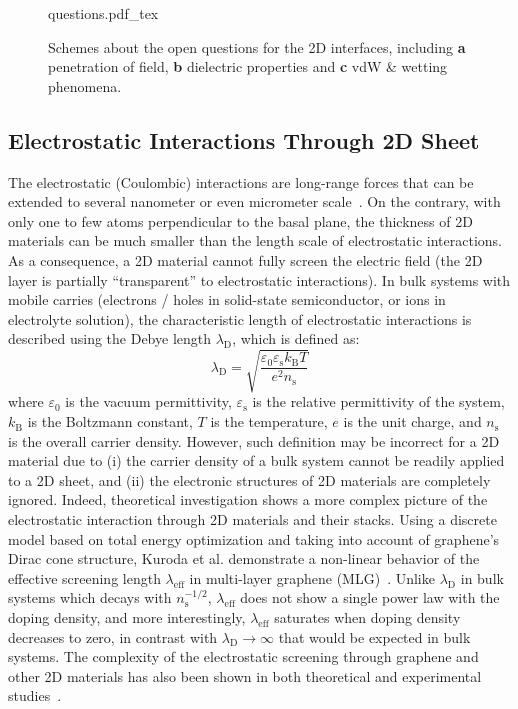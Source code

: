 \begin{figure}[h]
  \centering
  {questions.pdf_tex}
  \caption{\label{fig:intro-questions}%
    Schemes about the open questions for the 2D interfaces, including
    \textbf{a} penetration of field, \textbf{b} dielectric properties
    and \textbf{c} vdW \& wetting phenomena. }
\end{figure}


\subsection{Electrostatic Interactions Through 2D Sheet}
\label{sec:electr-inter-thro}

The electrostatic (Coulombic) interactions are long-range forces that
can be extended to several nano\-meter or even micro\-meter scale~\autocite{Lacava_2016-electrodyn}.
%
On the contrary, with only one to few atoms perpendicular to the basal
plane, the thickness of 2D materials can be much smaller than the
length scale of electrostatic interactions.
%
As a consequence, a 2D material cannot fully screen the electric field
(\ie the 2D layer is partially ``transparent'' to electrostatic
interactions).
%
In bulk systems with mobile carries (electrons / holes in solid-state
semiconductor, or ions in electrolyte solution), the characteristic
length of electrostatic interactions is described using the Debye
length $\lambda_{\mathrm{D}}$, which is defined as:
\begin{equation}
  \label{eq:intro-debye}
  \lambda_{\mathrm{D}} = {\displaystyle \sqrt{
      \frac{\varepsilon_{0} \varepsilon_{\mathrm{s}} k_{\mathrm{B}} T}
      {e^{2} n_{\mathrm{s}}}
    }}
\end{equation}
where $\varepsilon_{0}$ is the vacuum permittivity,
$\varepsilon_{\mathrm{s}}$ is the relative permittivity of the system,
$k_{\mathrm{B}}$ is the Boltzmann constant, $T$ is the temperature,
$e$ is the unit charge, and $n_{\mathrm{s}}$ is the overall carrier
density.
%
However, such definition may be incorrect for a 2D material due to
(i) the carrier density of a bulk system cannot be readily applied to
a 2D sheet, and (ii) the electronic structures of 2D materials are
completely ignored.
%
Indeed, theoretical investigation shows a more complex picture of the
electrostatic interaction through 2D materials and their stacks.
%
Using a discrete model based on total energy optimization and taking
into account of graphene's Dirac cone structure, Kuroda et
al. demonstrate a non-linear behavior of the effective screening
length $\lambda_{\mathrm{eff}}$ in multi-layer graphene
(MLG)~\autocite{Kuroda_2011_PRL_ML,Kuroda_2011_ML_gr,Rokni_2017_charge_ML_Gr}.
%
Unlike $\lambda_{\mathrm{D}}$ in bulk systems which decays with
$n_{\mathrm{s}}^{-1/2}$, $\lambda_{\mathrm{eff}}$ does not show a
single power law with the doping density, and more interestingly,
$\lambda_{\mathrm{eff}}$ saturates when doping density decreases to
zero, in contrast with $\lambda_{\mathrm{D}} \to \infty$ that would be
expected in bulk systems.
%
The complexity of the electrostatic screening through graphene and
other 2D materials has also been shown in both theoretical and
experimental
studies~\autocite{Datta_2009_ML_Screening,Uesugi_2013_EDL_ML,Goto_2013_ML_Gr,Liluhua_2014_hbn}.
%

